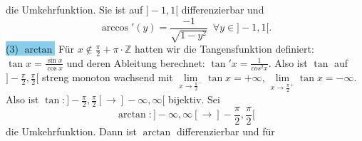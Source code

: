 \documentclass[landscape, 10pt]{article}
\newcommand{\Z}{\mathbb{Z}}
\begin{document}
\begin{multicols}{3}
\begin{equation*}
                            \end{equation*}
                            die Umkehrfunktion. Sie ist auf 
                            \textcolor{NavyBlue}{
                            $]-1,1[$}
                            differenzierbar und
                            \begin{equation*}
                                  \arccos'(y)
                                   =\frac{-1}{\sqrt{1-y^2}}
                                   \enspace
                                   \forall y\in]-1,1[.
                            \end{equation*}
                     \colorbox{SkyBlue}{(3) $\arctan$}
                            Für 
                            \textcolor{NavyBlue}{
                            $x\notin\frac{\pi}{2}
                            +\pi\cdot\Z$}
                            hatten wir die Tangensfunktion 
                            definiert:
                            \textcolor{NavyBlue}{
                            $\tan x=\frac{\sin x}{\cos x}$} 
                            und deren Ableitung berechnet:
                            \textcolor{NavyBlue}{
                            $\tan'x=\frac{1}{cos^2x}$}. 
                            Also ist 
                            \textcolor{NavyBlue}{$\tan$} auf
                            \textcolor{NavyBlue}{
                            $]-\frac{\pi}{2},\frac{\pi}{2}[$} 
                            streng monoton wachsend mit
                            \textcolor{NavyBlue}{
                            $\lim\limits_{x\to
                            \frac{\pi}{2}^{-}}\tan x=+\infty$},
                            \textcolor{NavyBlue}{
                            $\lim\limits_{x\to
                            \frac{\pi}{2}^{+}}\tan x=-\infty$}.
                            Also ist 
                            \textcolor{NavyBlue}{
                            $\tan:]-\frac{\pi}{2},\frac{\pi}{2}[
                            \longrightarrow]-\infty,\infty[$} 
                            bijektiv. Sei
                            \begin{equation*}
                                   \arctan:]-\infty,\infty[
                                   \longrightarrow
                                   ]-\frac{\pi}{2},\frac{\pi}{2}[
                            \end{equation*}
                            die Umkehrfunktion.
                            Dann ist 
                            \textcolor{NavyBlue}{
                            $\arctan$} differenzierbar und für

\end{multicols}
\end{document}

